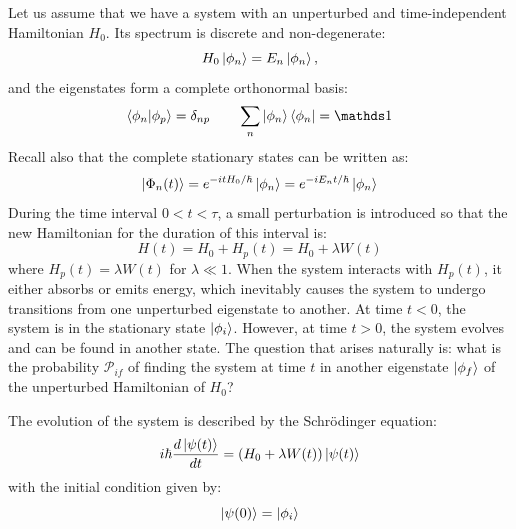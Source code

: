 Let us assume that we have a system with an unperturbed and time-independent Hamiltonian $H_0$. Its spectrum is discrete and non-degenerate:
\begin{equation}
    H_0 \ket{\phi_n} = E_n \ket{\phi_n},
\end{equation}
and the eigenstates form a complete orthonormal basis:
\begin{equation}
    \braket{\phi_n|\phi_p} = \delta_{np} \qquad \sum_n \ket{\phi_n}\bra{\phi_n} = \Imat
\end{equation}
Recall also that the complete stationary states can be written as:
\begin{equation}
    \ket{\Phi_n(t)} = e^{-itH_0/\hbar }\ket{\phi_n} = e^{-iE_nt/\hbar }\ket{\phi_n}
\end{equation}
During the time interval $0<t<\tau$, a small perturbation is introduced so that the new Hamiltonian for the duration of this interval is:
\begin{equation}
    H(t) = H_0 + H_p(t) = H_0 + \lambda W(t)
\end{equation}
where $H_p(t) = \lambda W(t)$ for $\lambda \ll 1$. When the system interacts with $H_p(t)$, it either absorbs or emits energy, which inevitably causes the system to undergo transitions from one
unperturbed eigenstate to another. At time $t<0$, the system is in the stationary state $\ket{\phi_i}$. However, at time $t > 0$, the system evolves and can be found in another state. The question that arises naturally is: what is the probability $\mathcal{P}_{if}$ of finding the system at time $t$ in another eigenstate $\ket{\phi_f}$ of the unperturbed Hamiltonian of $H_0$?

The evolution of the system is described by the Schrödinger equation:
\begin{equation}
    i\hbar \frac{d \ket{\psi(t)}}{dt} = (H_0 + \lambda W(t)) \ket{\psi(t)}
\end{equation}
with the initial condition given by:
\begin{equation}
    \ket{\psi(0)} = \ket{\phi_i}
\end{equation}

